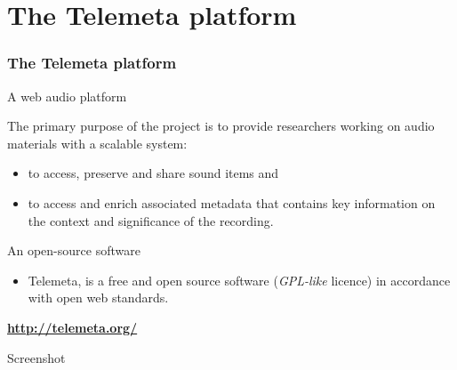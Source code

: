 \documentclass[final, hyperref, table]{beamer}
\begin{document}
\section[Telemeta]{The Telemeta platform}\label{sec:Telemeta}
\begin{frame}
  \frametitle{The Telemeta platform}
  \begin{block}{A web audio platform}
    
    The primary purpose of the project is to provide researchers
      working on audio materials with a scalable system:
      \begin{itemize}
      \item to access, preserve and share \alert{sound items} and
      \item to access and enrich \alert{associated metadata} that
        contains key information on the context and significance of
        the recording.
      \end{itemize}
   
    
  \end{block}
  \begin{block}{An open-source software}
    \begin{itemize}
    \item Telemeta, is a free and open source software (\emph{GPL-like} licence)
       in accordance with open web standards.
    \end{itemize}
    \vspace{-0.5cm}
    \begin{center}
\hspace{1cm}
      \colorbox{yellow!40}{\textbf{\url{http://telemeta.org/}}}
    \end{center}
  \end{block}
\end{frame}

\begin{frame}[plain]{Screenshot}
  \begin{center}
  \end{center}

\end{frame}
\end{document}
